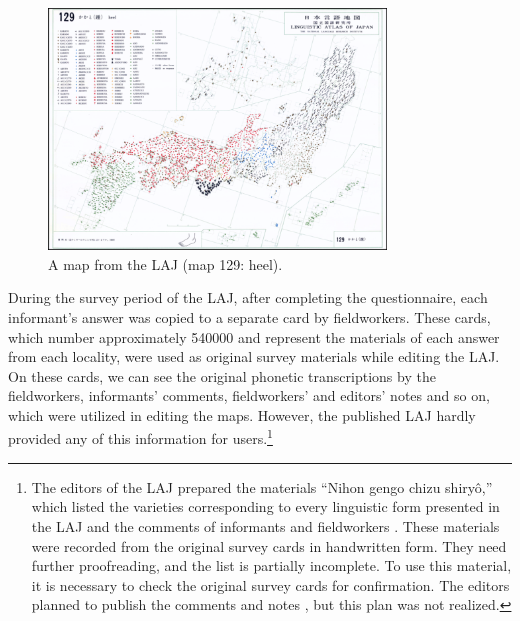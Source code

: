 \documentclass[output=paper]{LSP/langsci}
\begin{document}
\begin{figure} 
\includegraphics[width=0.8\textwidth]{illustrations/kuma_fig01}
\caption{A map from the LAJ (map 129: heel).}          
\label{fig:1}
\end{figure}  

\largerpage[-3]
During the survey period of the LAJ, after completing the questionnaire, each informant’s answer was copied to a separate card by fieldworkers. These cards, which number approximately 540000 \citep[38, 43]{kokuritsu_kokugo_kenkyujo_nlri_nihon_1966} and represent the materials of each answer from each locality, were used as original survey materials while editing the LAJ. On these cards, we can see the original phonetic transcriptions by the fieldworkers, informants’ comments, fieldworkers’ and editors’ notes and so on, which were utilized in editing the maps. However, the published LAJ hardly provided any of this information for users.\footnote{The editors of the LAJ prepared the materials “Nihon gengo chizu shiryô,” which listed the varieties corresponding to every linguistic form presented in the LAJ and the comments of informants and fieldworkers \citep[32, 33]{kokuritsu_kokugo_kenkyujo_nlri_nihon_1966}. These materials were recorded from the original survey cards in handwritten form. They need further proofreading, and the list is partially incomplete. To use this material, it is necessary to check the original survey cards for confirmation. The editors planned to publish the comments and notes \citep[44]{kokuritsu_kokugo_kenkyujo_nlri_nihon_1966}, but this plan was not realized.}
\end{document}
